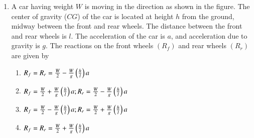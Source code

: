 \documentclass[journal]{IEEEtran}
\begin{document}
\begin{enumerate}
    \item A car having weight $W$ is moving in the direction as shown in the figure. The center of gravity ($CG$) of the car is located at height $h$ from the ground, midway between the front and rear wheels. The distance between the front and rear wheels is $l$. The acceleration of the car is $a$, and acceleration due to gravity is $g$. The reactions on the front wheels $(R_{f})$ and rear wheels $(R_{r})$ are given by
        \begin{figure}[!ht]
            \centering
            
        \end{figure}
        \begin{enumerate}
            \item $R_{f}=R_{r}=\frac{W}{2}-\frac{W}{g}\left(\frac{h}{l}\right)a$
            \item $R_{f}=\frac{W}{2}+\frac{W}{g}\left(\frac{h}{l}\right)a; R_{r}=\frac{W}{2}-\frac{W}{g}\left(\frac{h}{l}\right)a$
            \item $R_{f}=\frac{W}{2}-\frac{W}{g}\left(\frac{h}{l}\right)a; R_{r}=\frac{W}{2}+\frac{W}{g}\left(\frac{h}{l}\right)a$
            \item $R_{f}=R_{r}=\frac{W}{2}+\frac{W}{g}\left(\frac{h}{l}\right)a$
        \end{enumerate}

    \end{enumerate}
\end{document}
